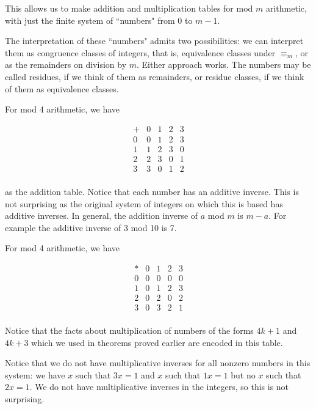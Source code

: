 \documentclass[12pt]{article}
\begin{document}
\begin{description}
This allows us to make addition and multiplication tables for mod $m$ arithmetic, with just the finite system of ``numbers" from 0 to $m-1$.

The interpretation of these ``numbers" admits two possibilities:  we can interpret them as congruence classes of integers, that is,
equivalence classes under $\equiv_m$, or as the remainders on division by $m$.  Either approach works.  The numbers may be called residues, if we think of them as remainders, or residue classes, if we think of them as equivalence classes.

For mod 4 arithmetic, we have

$$\begin{array}{c|cccc}

+ & 0& 1 &2& 3 \\ \hline

0 & 0& 1 &2& 3 \\
1 & 1& 2 &3& 0 \\
2& 2& 3 &0 & 1 \\
3& 3& 0 &1 & 2 \\

\end{array}$$

as the addition table.  Notice that each number has an additive inverse.  This is not surprising as the original system of integers on which this is based has additive inverses.  In general, the addition inverse of $a$ mod $m$ is $m-a$. For example the additive inverse of 3 mod 10 is 7.

For mod 4 arithmetic, we have 

$$\begin{array}{c|ccccc}

* & 0& 1 &2& 3 \\ \hline

0 & 0& 0 &0& 0 \\
1 & 0& 1 &2& 3 \\
2& 0& 2 &0 & 2 \\
3& 0& 3 &2 & 1 \\

\end{array}$$

Notice that the facts about multiplication of numbers of the forms $4k+1$ and $4k+3$ which we used in theorems proved earlier are encoded in this table.

Notice that we do not have multiplicative inverses for all nonzero numbers in this system:  we have $x$ such that $3x=1$ and $x$ such that $1x=1$
but no $x$ such that $2x=1$.  We do not have multiplicative inverses in the integers, so this is not surprising.


\end{description}
\end{document}
